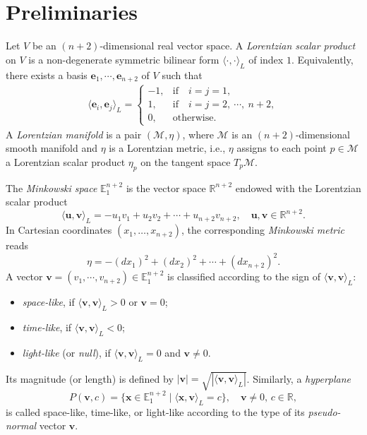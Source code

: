 \documentclass[reqno,11pt, letterpaper]{amsart}
\def\R{{\mathbb R}}
\def\E{{\mathbb E}}
\theoremstyle{plain}
\theoremstyle{definition}
\def\Bbb#1{{\mathbb#1}}
\def\R{\Bbb R}  \def\C{\Bbb C}
\numberwithin{equation}{section}
\begin{document}
\section{Preliminaries}\label{sec-pre}
Let $V$ be an $(n+2)$-dimensional real vector space. A {\it Lorentzian scalar product} on $V$ is a non-degenerate symmetric bilinear form
$\langle\cdot,\cdot\rangle_L$ of index $1$. Equivalently, there exists a basis $\mathbf{e}_1,\cdots,\mathbf{e}_{n+2}$ of $V$ such that
\begin{align*}
  \langle\mathbf{e}_i,\mathbf{e}_j\rangle_L=\left
                \{\begin{array}{cl}
                     -1, & \mathrm{if}\quad i=j=1,  \\
                     1, & \mathrm{if}\quad i=j=2,\ \cdots,\ n+2, \\
                     0, & \mathrm{otherwise}.
                   \end{array}
  \right.
\end{align*}
A {\it Lorentzian manifold} is a pair $(\mathcal{M}, \eta)$, where $\mathcal{M}$ is an $(n+2)$-dimensional smooth
manifold and $\eta$ is a Lorentzian metric, i.e., $\eta$ assigns to each point $p\in \mathcal{M}$ a
Lorentzian scalar product $\eta_p$ on the tangent space $T_p\mathcal{M}$.

The {\it Minkowski space} $\E_1^{n+2}$ is the vector space $\R^{n+2}$ endowed with the Lorentzian scalar product
\[
\langle \mathbf{u}, \mathbf{v} \rangle_L = -u_1 v_1 + u_2 v_2 + \cdots + u_{n+2} v_{n+2}, \quad 
\mathbf{u},\mathbf{v} \in \mathbb{R}^{n+2}.
\]
In Cartesian coordinates $(x_1,\dots,x_{n+2})$, the corresponding {\it Minkowski metric} reads
\[
\eta = -(dx_1)^2 + (dx_2)^2 + \cdots + (dx_{n+2})^2.
\]
A vector $\mathbf{v}=(v_1,\cdots,v_{n+2})\in\E_1^{n+2}$ is classified  according to the sign of $\langle \mathbf v,\mathbf v\rangle_L$:
\begin{itemize}
	\item {\it space-like}, if $\langle \mathbf v,\mathbf v\rangle_L >0$ or $\mathbf v=0$;
	\item {\it time-like}, if $\langle \mathbf v,\mathbf v\rangle_L <0$;
	\item {\it light-like} (or {\it null}), if $\langle \mathbf v,\mathbf v\rangle_L=0$ and $\mathbf v\neq 0$.
\end{itemize}
Its magnitude (or length) is defined by $|\mathbf{v}| = \sqrt{|\langle \mathbf{v},\mathbf{v} \rangle_L|}$. Similarly, a \textit{hyperplane }
\[
P(\mathbf{v},c) = \{ \mathbf{x} \in \mathbb{E}_1^{n+2} \mid \langle \mathbf{x}, \mathbf{v} \rangle_L = c \}, \quad \mathbf{v}\neq 0,\, c\in\mathbb{R},
\]
is called space-like, time-like, or light-like according to the type of its \textit{pseudo-normal} vector $\mathbf{v}$.
\end{document}
